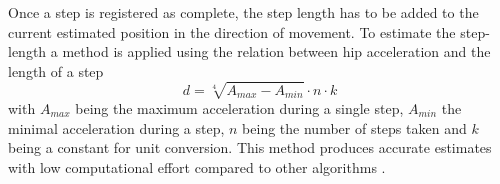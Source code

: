 \documentclass[engproc,conferenceproceedings,submit,pdftex,moreauthors]{Definitions/mdpi}
\begin{document}
Once  a step is registered as complete, the step length has to be added to the current estimated position in the direction of movement. To estimate the step-length a method is applied using the relation between hip acceleration and the length of a step \cite{weinberg2002} 
 \begin{equation}
	d = \sqrt[4]{A_{max}-A_{min}}\cdot n\cdot k
\end{equation}
 with $A_{max}$ being the maximum acceleration during a single step, $A_{min}$ the minimal acceleration during a step, $n$ being the number of steps taken and $k$ being a constant for unit conversion. This method produces accurate estimates with low computational effort compared to other algorithms \cite{petukhov2022, shin2007, zizzo2017}.
\end{document}
